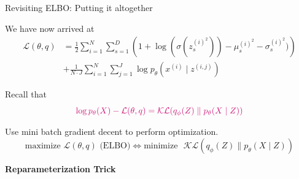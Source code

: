 \documentclass{beamer}
\begin{document}
\begin{frame}{Revisiting ELBO: Putting it altogether}

We have now arrived at
\begin{align*}
 \mathcal{L}(\theta,q)
&=\frac{1}{2} \sum_{i=1}^N \sum_{s=1}^D
 \left(1+\log(\sigma(z_s^{{(i)}^2}))
 -\mu_s^{{(i)}^2}
 -\sigma_s^{{(i)}^2})\right)\\
&+\frac{1}{N\cdot J} \sum_{i=1}^N \sum_{j=1}^J
 \log p_{\theta}(x^{(i)} \mid z^{(i,j)})
\end{align*}

Recall that
$$\textcolor{DeepPink3}{\log p_{\theta}(X)-\mathcal{L}(\theta,q)
=\mathcal{KL}(q_{\phi}(Z)\parallel p_{\theta}(X\mid Z))}$$

Use mini batch gradient decent to perform optimization.
$$\text{maximize } \mathcal{L}(\theta,q) \text{ (ELBO)} \Longleftrightarrow \text{minimize~~} \mathcal{KL}(q_{\phi}(Z)\parallel p_{\theta}(X\mid Z))$$

\end{frame}
{%
\begin{frame}
\begin{center}
{\bf\LARGE Reparameterization Trick}
\end{center}
\end{frame}
}%
\end{document}
